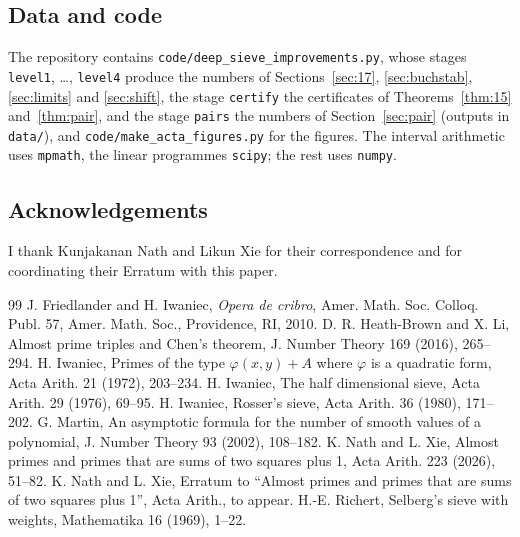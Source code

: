 \documentclass[11pt,a4paper]{amsart}
\theoremstyle{remark}
\numberwithin{equation}{section}
\begin{document}
\subsection*{Data and code}
The repository contains \texttt{code/deep\_sieve\_improvements.py}, whose stages \texttt{level1}, \dots,
\texttt{level4} produce the numbers of Sections~\ref{sec:17}, \ref{sec:buchstab}, \ref{sec:limits} and
\ref{sec:shift}, the stage \texttt{certify} the certificates of Theorems~\ref{thm:15} and~\ref{thm:pair}, and the stage \texttt{pairs}
the numbers of Section~\ref{sec:pair} (outputs in \texttt{data/}), and \texttt{code/make\_acta\_figures.py} for the figures. The
interval arithmetic uses \texttt{mpmath}, the linear programmes \texttt{scipy}; the rest uses \texttt{numpy}.

\subsection*{Acknowledgements}
I thank Kunjakanan Nath and Likun Xie for their correspondence and for coordinating their Erratum with this
paper.

\begin{thebibliography}{99}
 J. Friedlander and H. Iwaniec, \emph{Opera de cribro}, Amer. Math. Soc. Colloq. Publ. 57, Amer. Math.
Soc., Providence, RI, 2010.
 D. R. Heath-Brown and X. Li, Almost prime triples and Chen's theorem, J. Number Theory 169 (2016),
265--294.
 H. Iwaniec, Primes of the type $\varphi(x,y)+A$ where $\varphi$ is a quadratic form, Acta Arith. 21
(1972), 203--234.
 H. Iwaniec, The half dimensional sieve, Acta Arith. 29 (1976), 69--95.
 H. Iwaniec, Rosser's sieve, Acta Arith. 36 (1980), 171--202.
 G. Martin, An asymptotic formula for the number of smooth values of a polynomial, J. Number Theory
93 (2002), 108--182.
 K. Nath and L. Xie, Almost primes and primes that are sums of two squares plus 1, Acta Arith. 223
(2026), 51--82.
 K. Nath and L. Xie, Erratum to ``Almost primes and primes that are sums of two squares plus 1'',
Acta Arith., to appear.
 H.-E. Richert, Selberg's sieve with weights, Mathematika 16 (1969), 1--22.
\end{thebibliography}
\end{document}
